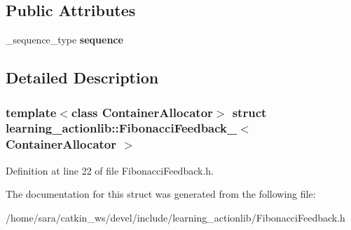 \subsection*{Public Attributes}
\begin{DoxyCompactItemize}
\item 
\mbox{\label{structlearning__actionlib_1_1FibonacciFeedback___a18b79303819fa42df9dfb202bd2cc098}} 
\+\_\+sequence\+\_\+type {\bfseries sequence}
\end{DoxyCompactItemize}


\subsection{Detailed Description}
\subsubsection*{template$<$class Container\+Allocator$>$\newline
struct learning\+\_\+actionlib\+::\+Fibonacci\+Feedback\+\_\+$<$ Container\+Allocator $>$}



Definition at line 22 of file Fibonacci\+Feedback.\+h.



The documentation for this struct was generated from the following file\+:\begin{DoxyCompactItemize}
\item 
/home/sara/catkin\+\_\+ws/devel/include/learning\+\_\+actionlib/Fibonacci\+Feedback.\+h\end{DoxyCompactItemize}
